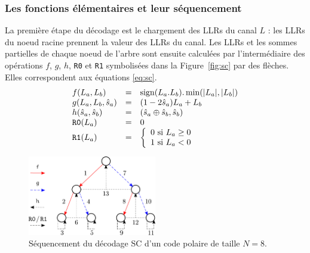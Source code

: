 \subsubsection{Les fonctions élémentaires et leur séquencement}
La première étape du décodage est le chargement des LLRs du canal $L$ : les LLRs du noeud racine prennent la valeur des LLRs du canal. Les LLRs et les sommes partielles de chaque noeud de l'arbre sont ensuite calculées par l'intermédiaire des opérations $f$, $g$, $h$, \texttt{R0} et \texttt{R1} symbolisées dans la Figure~\ref{fig:sc} par des flèches. Elles correspondent aux équations \ref{eq:sc}. 
\begin{eqnarray}
  \begin{array}{l c l}
    f(L_a,L_b) &=& \text{sign}(L_a.L_b).\min(|L_a|,|L_b|)\\
    g(L_a,L_b,\hat{s}_a)&=&(1-2\hat{s}_a)L_a+L_b\\
    h(\hat{s}_a,\hat{s}_b)&=& (\hat{s}_{a} \oplus \hat{s}_{b}, \hat{s}_{b})\\
    \texttt{R0}(L_a) &=& 0 \\
    \texttt{R1}(L_a) &=&  \left\{\begin{array}{l c l} 0 \text{ si } L_a \geq 0 \\ 1 \text{ si } L_a < 0 \end{array}\right.
  \end{array}
  \label{eq:sc}
\end{eqnarray}
\begin{figure}[b]
\centering
\includegraphics[width=0.5\textwidth]{main/ch1_fig/seq_sc}
\caption{Séquencement du décodage SC d'un code polaire de taille $N=8$.}
\label{fig:seq_sc}
\end{figure}
